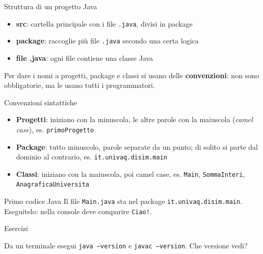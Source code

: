 \documentclass[aspectratio=169,10pt,t]{beamer}
\begin{document}
\begin{frame}{Struttura di un progetto Java}
  \begin{itemize}
    \item \textbf{src}: cartella principale con i file \texttt{.java}, divisi in package
    \item \textbf{package}: raccoglie pi\`u file \texttt{.java} secondo una certa logica
    \item \textbf{file .java}: ogni file contiene una classe Java
  \end{itemize}
  \vspace{0.5em}
  Per dare i nomi a progetti, package e classi si usano delle \textbf{convenzioni}: non sono obbligatorie, ma le usano tutti i programmatori.
\end{frame}

\begin{frame}{Convenzioni sintattiche}
  \begin{itemize}
    \item \textbf{Progetti}: iniziano con la minuscola, le altre parole con la maiuscola (\emph{camel case}), es. \texttt{primoProgetto}
    \item \textbf{Package}: tutto minuscolo, parole separate da un punto; di solito si parte dal dominio al contrario, es. \texttt{it.univaq.disim.main}
    \item \textbf{Classi}: iniziano con la maiuscola, poi camel case, es. \texttt{Main}, \texttt{SommaInteri}, \texttt{AnagraficaUniversita}
  \end{itemize}
\end{frame}

\begin{frame}{Primo codice Java}
  \vspace{0.5em}
  Il file \texttt{Main.java} sta nel package \texttt{it.univaq.disim.main}. Eseguitelo: nella console deve comparire \texttt{Ciao!}.
\end{frame}

\begin{frame}{Esercizi}
  \begin{esercizio}
    Da un terminale esegui \texttt{java --version} e \texttt{javac --version}. Che versione vedi?
  \end{esercizio}
\end{frame}
\end{document}
